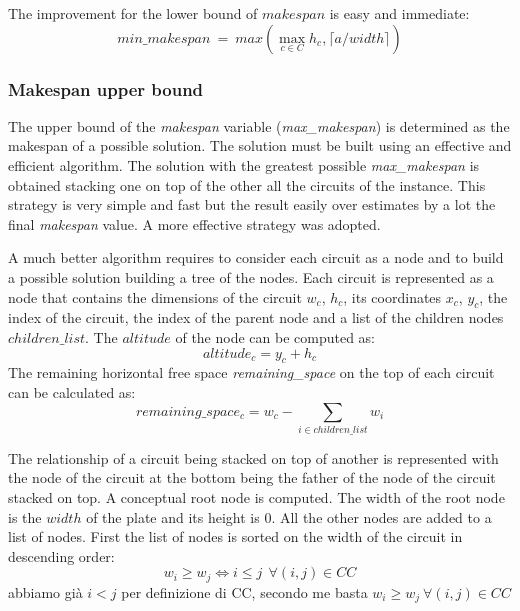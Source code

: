         The improvement for the lower bound of $makespan$ is easy and immediate:
        \begin{equation}
            min\_makespan\ =\ max\left(\max_{c \in C} h_c, \lceil a / width \rceil\right)
        \end{equation}

    \subsubsection{Makespan upper bound}
        The upper bound of the \textit{makespan} variable (\textit{max\_makespan}) is determined as the makespan of a possible 
        solution. The solution must be built using an effective and efficient algorithm. 
        The solution with the greatest possible \textit{max\_makespan} is obtained stacking one on top of the other all the circuits
        of the instance. This strategy is very simple and fast but the result easily over estimates by a lot the final 
        \textit{makespan} value. A more effective strategy was adopted.
        
        A much better algorithm requires to consider each circuit as a node and to build a possible solution building a tree of the nodes. 
        Each circuit is represented as a node that contains the dimensions of the circuit $w_c$, $h_c$, its coordinates 
        $x_c$, $y_c$, the index of the circuit, the index of the parent node and a list of the children nodes 
        $children\_list$. The $altitude$ of the node can be computed as:
        \begin{equation}
            altitude_c = y_c + h_c
        \end{equation}
        The remaining horizontal free space \textit{remaining\_space} on the top of each circuit can be calculated as:
        \begin{equation}
            remaining\_space_c = w_c - \sum_{i \in children\_list} w_i
        \end{equation}
        
        The relationship of a circuit being stacked on top of another is represented with the node of the circuit at the bottom 
        being the father of the node of the circuit stacked on top.
        A conceptual root node is computed. The width of the root node is the $width$ of the plate and its height is 0.
        All the other nodes are added to a list of nodes.
        First the list of nodes is sorted on the width of the circuit in descending order:
        \begin{equation}
            w_i \geq w_j \Longleftrightarrow i \leq j\   \ \forall (i,j) \in CC
        \end{equation}
        \colorbox{BurntOrange}{abbiamo già $i < j$ per definizione di CC, secondo me basta $w_i \geq w_j \ \forall (i,j) \in CC$}

